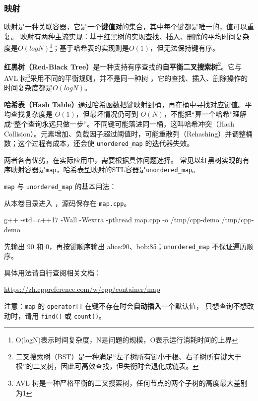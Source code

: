 \subsubsection{映射}

映射是一种关联容器，它是一个\textbf{键值对}的集合，其中每个键都是唯一的，值可以重复。
映射有两种主流实现：基于红黑树的实现查找、插入、删除的平均时间复杂度是$O(logN)$\footnote{
    O(logN)表示时间复杂度，N是问题的规模，O表示运行消耗时间的上界
}；基于哈希表的实现则是$O(1)$，但无法保持键有序。



\textbf{红黑树（Red-Black Tree）}是一种支持有序查找的\textbf{自平衡二叉搜索树}\footnote{
    二叉搜索树（BST）是一种满足“左子树所有键小于根、右子树所有键大于根”的二叉树，因此可高效查找，但失衡时会退化成链表。
}。它与 AVL 树\footnote{
    AVL 树是一种严格平衡的二叉搜索树，任何节点的两个子树的高度最大差别为1
}采用不同的平衡规则，并不是同一种树
，它的查找、插入、删除操作的时间复杂度都是$O(logN)$。

\textbf{哈希表（Hash Table）}通过哈希函数把键映射到桶，再在桶中寻找对应键值。平均查找复杂度是 $O(1)$，但最坏情况仍可到 $O(N)$，不能把“算一个哈希”理解成“整个查询永远只做一步”。不同键可能落进同一桶，这叫哈希冲突（Hash Collision）。元素增加、负载因子超过阈值时，可能重散列（Rehashing）并调整桶数；这个过程有成本，还会使 \texttt{unordered\_map} 的迭代器失效。

两者各有优劣，在实际应用中，需要根据具体问题选择。
常见以红黑树实现的有序映射容器是\texttt{map}，哈希表型映射的STL容器是\texttt{unordered\_map}。

\begin{example}
\texttt{map} 与 \texttt{unordered\_map} 的基本用法：



从本卷目录进入 ，源码保存在 \texttt{map.cpp}。
\begin{tbash}
g++ -std=c++17 -Wall -Wextra -pthread map.cpp -o /tmp/cpp-demo
/tmp/cpp-demo
\end{tbash}
先输出 90 和 0，再按键顺序输出 alice:90、bob:85；\texttt{unordered\_map} 不保证遍历顺序。
\end{example}

\begin{note}
具体用法请自行查阅相关文档：

\url{https://zh.cppreference.com/w/cpp/container/map}

注意：\texttt{map} 的 \texttt{operator[]} 在键不存在时会\textbf{自动插入}一个默认值，
只想查询不想改动时，请用 \texttt{find()} 或 \texttt{count()}。
\end{note}

